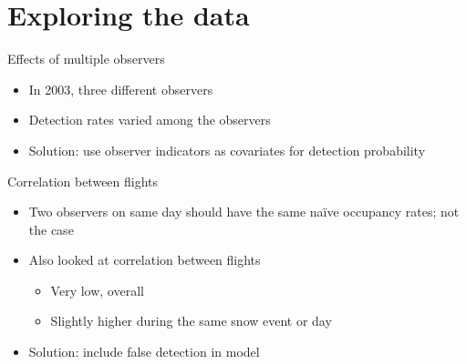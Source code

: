 \documentclass{beamer}
\begin{document}
\section{Exploring the data}
\begin{frame}{Effects of multiple observers}
	\begin{itemize}
		\item In 2003, three different observers
		\item Detection rates varied among the observers
	\end{itemize}
	\begin{center}
	\end{center}
	\begin{itemize}
		\item Solution: use observer indicators as covariates for detection
		probability
	\end{itemize}
\end{frame}

\begin{frame}{Correlation between flights}
	\begin{itemize}
		\item Two observers on same day should have the same na\"ive occupancy
		rates; not the case
		\item Also looked at correlation between flights
		\begin{itemize}
			\item Very low, overall
			\item Slightly higher during the same snow event or day
		\end{itemize}
		\item Solution: include false detection in model
	\end{itemize}
\end{frame}
\end{document}
